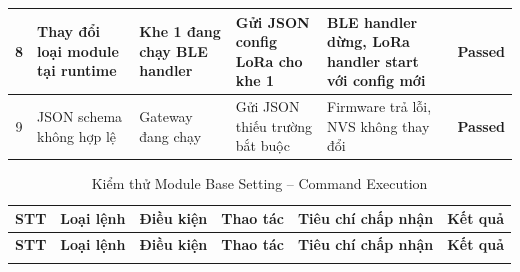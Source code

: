 \begin{longtable}{|c|p{2cm}|p{2.5cm}|p{3.5cm}|p{4cm}|c|}
            8 & Thay đổi loại module tại runtime & Khe 1 đang chạy BLE handler & Gửi JSON config LoRa cho khe 1 & BLE handler dừng, LoRa handler start với config mới & \textcolor{modern_blue}{\textbf{Passed}} \\ \hline
            9 & JSON schema không hợp lệ & Gateway đang chạy & Gửi JSON thiếu trường bắt buộc & Firmware trả lỗi, NVS không thay đổi & \textcolor{modern_blue}{\textbf{Passed}} \\ \hline
        \end{longtable}
        
        \begin{longtable}{|c|p{2cm}|p{2.5cm}|p{3.5cm}|p{4cm}|c|}
            \caption{Kiểm thử Module Base Setting -- Command Execution}
            \label{tab:test_module_base_command} \\
            \hline
            \textbf{STT} & \textbf{Loại lệnh} & \textbf{Điều kiện} & \textbf{Thao tác} & \textbf{Tiêu chí chấp nhận} & \textbf{Kết quả} \\ \hline
            \endfirsthead
            \hline
            \textbf{STT} & \textbf{Loại lệnh} & \textbf{Điều kiện} & \textbf{Thao tác} & \textbf{Tiêu chí chấp nhận} & \textbf{Kết quả} \\ \hline
            \endhead
            \hline
            \endfoot
            \endlastfoot
        

\end{longtable}
